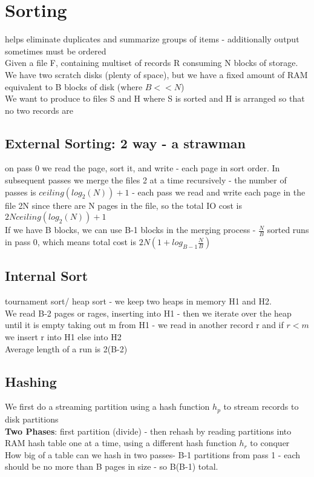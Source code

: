\documentclass{article}
\begin{document}
\section{Sorting} 
helps eliminate duplicates and summarize groups of items - additionally output sometimes must be ordered \\
Given a file F, containing multiset of records R consuming N blocks of storage. We have two scratch disks (plenty of space), but we have a fixed amount of RAM equivalent to B blocks of disk (where $B << N$)\\
We want to produce to files S and H where S is sorted and H is arranged so that no two records are
\subsection{External Sorting: 2 way - a strawman} on pass 0 we read the page, sort it, and write - each page in sort order. In subsequent passes we merge the files 2 at a time recursively - the number of passes is $ceiling(log_2(N)) + 1$ - each pass we read and write each page in the file 2N since there are N pages in the file, so the total IO cost is $2Nceiling(log_2(N)) + 1$ \\
If we have B blocks, we can use B-1 blocks in the merging process - $\frac{N}{B}$ sorted runs in pass 0, which means total cost is $2N(1 + log_{B-1}\frac{N}{B})$
\subsection{Internal Sort} 
tournament sort/ heap sort - we keep two heaps in memory H1 and H2. \\
We read B-2 pages or rages, inserting into H1 - then we iterate over the heap until it is empty taking out m from H1 - we read in another record r and if $r<m$ we insert r into H1 else into H2\\
Average length of a run is 2(B-2)
\subsection{Hashing}
We first do a streaming partition using a hash function $h_p$ to stream records to disk partitions \\
\textbf{Two Phases}: first partition (divide) - then rehash by reading partitions into RAM hash table one at a time, using a different hash function $h_r$ to conquer \\
How big of a table can we hash in two passes- B-1 partitions from pass 1 - each should be no more than B pages in size - so B(B-1) total. 
\end{document}

